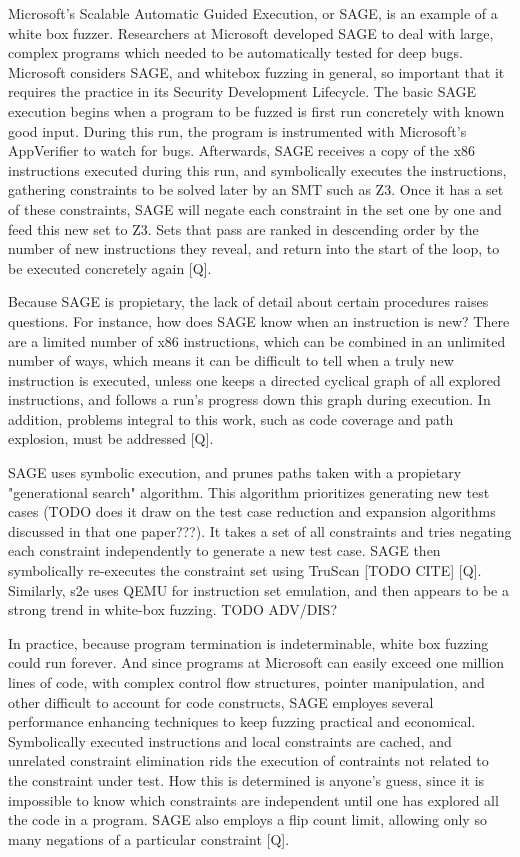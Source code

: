 \documentclass[11pt,expanded,copyright]{fsuthesis}
\begin{document}
Microsoft's Scalable Automatic Guided Execution, or SAGE, is an example of a white box fuzzer. Researchers at Microsoft developed SAGE to deal with large, complex programs which needed to be automatically tested for deep bugs. Microsoft considers SAGE, and whitebox fuzzing in general, so important that it requires the practice in its Security Development Lifecycle. The basic SAGE execution begins when a program to be fuzzed is first run concretely with known good input. During this run, the program is instrumented with Microsoft's AppVerifier to watch for bugs. Afterwards, SAGE receives a copy of the x86 instructions executed during this run, and symbolically executes the instructions, gathering constraints to be solved later by an SMT such as Z3. Once it has a set of these constraints, SAGE will negate each constraint in the set one by one and feed this new set to Z3. Sets that pass are ranked in descending order by the number of new instructions they reveal, and return into the start of the loop, to be executed concretely again [Q].

Because SAGE is propietary, the lack of detail about certain procedures raises questions. For instance, how does SAGE know when an instruction is new? There are a limited number of x86 instructions, which can be combined in an unlimited number of ways, which means it can be difficult to tell when a truly new instruction is executed, unless one keeps a directed cyclical graph of all explored instructions, and follows a run's progress down this graph during execution. In addition, problems integral to this work, such as code coverage and path explosion, must be addressed [Q].

SAGE uses symbolic execution, and prunes paths taken with a propietary "generational search" algorithm. This algorithm prioritizes generating new test cases (TODO does it draw on the test case reduction and expansion algorithms discussed in that one paper???). It takes a set of all constraints and tries negating each constraint independently to generate a new test case. SAGE then symbolically re-executes the constraint set using TruScan [TODO CITE] [Q]. Similarly, s2e uses QEMU for instruction set emulation, and then appears to be a strong trend in white-box fuzzing. TODO ADV/DIS?

In practice, because program termination is indeterminable, white box fuzzing could run forever. And since programs at Microsoft can easily exceed one million lines of code, with complex control flow structures, pointer manipulation, and other difficult to account for code constructs, SAGE employes several performance enhancing techniques to keep fuzzing practical and economical. Symbolically executed instructions and local constraints are cached, and unrelated constraint elimination rids the execution of contraints not related to the constraint under test. How this is determined is anyone's guess, since it is impossible to know which constraints are independent until one has explored all the code in a program. SAGE also employs a flip count limit, allowing only so many negations of a particular constraint [Q]. 
\end{document}
